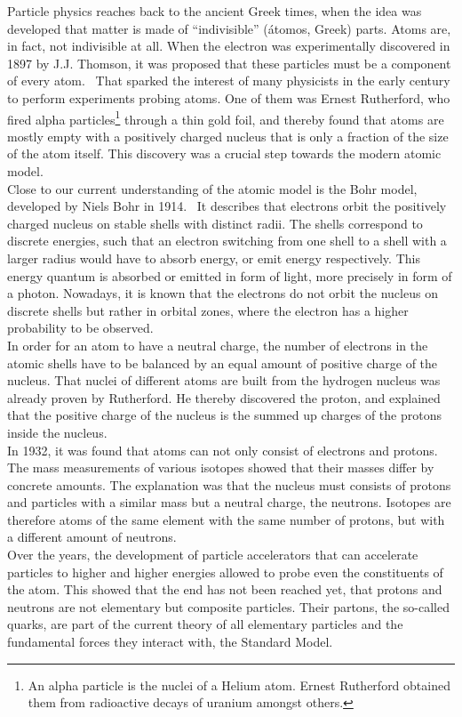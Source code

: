 Particle physics reaches back to the ancient Greek times, when the idea was developed that matter is made of ``indivisible'' (\'atomos, Greek) parts.
Atoms are, in fact, not indivisible at all.
When the electron was experimentally discovered in 1897 by J.J. Thomson, it was proposed that these particles must be a component of every atom.~\cite[p. 13ff]{Griffiths}
That sparked the interest of many physicists in the early  century to perform experiments probing atoms.
One of them was Ernest Rutherford, who fired alpha particles\footnote{An alpha particle is the nuclei of a Helium atom. Ernest Rutherford obtained them from radioactive decays of uranium amongst others.} through a thin gold foil, and thereby found that atoms are mostly empty with a positively charged nucleus that is only a fraction of the size of the atom itself.
This discovery was a crucial step towards the modern atomic model.\\
Close to our current understanding of the atomic model is the Bohr model, developed by Niels Bohr in 1914.~\cite[p. 15]{Griffiths}
It describes that electrons orbit the positively charged nucleus on stable shells with distinct radii.
The shells correspond to discrete energies, such that an electron switching from one shell to a shell with a larger radius would have to absorb energy, or emit energy respectively.
This energy quantum is absorbed or emitted in form of light, more precisely in form of a photon.
Nowadays, it is known that the electrons do not orbit the nucleus on discrete shells but rather in orbital zones, where the electron has a higher probability to be observed.\\
In order for an atom to have a neutral charge, the number of electrons in the atomic shells have to be balanced by an equal amount of positive charge of the nucleus.
That nuclei of different atoms are built from the hydrogen nucleus was already proven by Rutherford.
He thereby discovered the proton, and explained that the positive charge of the nucleus is the summed up charges of the protons inside the nucleus.\\
In 1932, it was found that atoms can not only consist of electrons and protons.~\cite[p. 15]{Griffiths}
The mass measurements of various isotopes showed that their masses differ by concrete amounts.
The explanation was that the nucleus must consists of protons and particles with a similar mass but a neutral charge, the neutrons.
Isotopes are therefore atoms of the same element with the same number of protons, but with a different amount of neutrons.\\
Over the years, the development of particle accelerators that can accelerate particles to higher and higher energies allowed to probe even the constituents of the atom.
This showed that the end has not been reached yet, that protons and neutrons are not elementary but composite particles.
Their partons, the so-called quarks, are part of the current theory of all elementary particles and the fundamental forces they interact with, the Standard Model.
